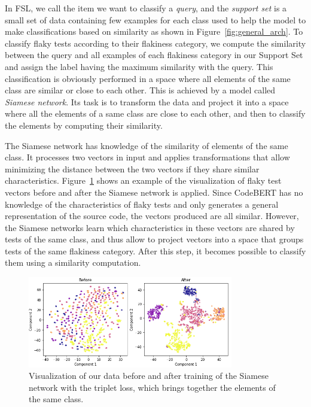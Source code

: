 In FSL, we call the item we want to classify a \textit{query}, and the \textit{support set} is a small set of data containing few examples for each class used to help the model to make classifications based on similarity as shown in Figure~\ref{fig:general_arch}.
To classify flaky tests according to their flakiness category, we compute the similarity between the query and all examples of each flakiness category in our Support Set and assign the label having the maximum similarity with the query. This classification is obviously performed in a space where all elements of the same class are similar or close to each other. This is achieved by a model called \textit{Siamese network}. Its task is to transform the data and project it into a space where all the elements of a same class are close to each other, and then to classify the elements by computing their similarity.

The Siamese network has knowledge of the similarity of elements of the same class. It processes two vectors in input and applies transformations that allow minimizing the distance between the two vectors if they share similar characteristics. Figure~\ref{fig:before_after} shows an example of the visualization of flaky test vectors before and after the Siamese network is applied. Since CodeBERT has no knowledge of the characteristics of flaky tests and only generates a general representation of the source code, the vectors produced are all similar.
However, the Siamese networks learn which characteristics in these vectors are shared by tests of the same class, and thus allow to project vectors into a space that groups tests of the same flakiness category. After this step, it becomes possible to classify them using a similarity computation.

\begin{figure}[htbp]
\centering
\includegraphics[width = 0.8\textwidth, scale=1]{figures/flakycat/before_after.PNG}
\caption{Visualization of our data before and after training of the Siamese network with the triplet loss, which brings together the elements of the same class.}
\label{fig:before_after}
\end{figure}

